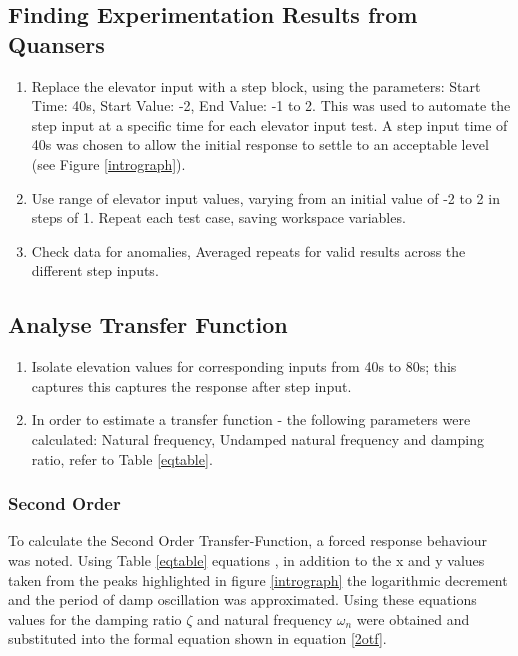 \subsection{Finding Experimentation Results from
Quansers}\label{finding-experimentation-results-from-quansers}

\begin{enumerate}

\item
  Replace the elevator input with a step block, using the parameters:
  Start Time: 40s, Start Value: -2, End Value: -1 to 2. This was used to
  automate the step input at a specific time for each elevator input
  test. A step input time of 40s was chosen to allow the initial
  response to settle to an acceptable level (see Figure
  \ref{intrograph}).
\item
  Use range of elevator input values, varying from an initial value of
  -2 to 2 in steps of 1. Repeat each test case, saving workspace
  variables.
\item
  Check data for anomalies, Averaged repeats for valid results across
  the different step inputs.
\end{enumerate}

\subsection{Analyse Transfer Function}\label{analyse-transfer-function}

\begin{enumerate}

\item
  Isolate elevation values for corresponding inputs from 40s to 80s;
  this captures this captures the response after step input.
\item
  In order to estimate a transfer function - the following parameters
  were calculated: Natural frequency, Undamped natural frequency and
  damping ratio, refer to Table \ref{eqtable}.
\end{enumerate}

\subsubsection{Second Order}\label{second-order}

To calculate the Second Order Transfer-Function, a forced response
behaviour was noted. Using Table \ref{eqtable} equations \cite{vibnote}
\cite{vibnote2}, in addition to the x and y values taken from the peaks
highlighted in figure \ref{intrograph} the logarithmic decrement and the
period of damp oscillation was approximated. Using these equations
values for the damping ratio \(\zeta\) and natural frequency
\(\omega_n\) were obtained and substituted into the formal equation
shown in equation \ref{2otf}.

